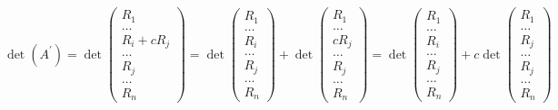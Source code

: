 \documentclass{book}
\begin{document}
\begin{equation}
  \det(A^\prime)=\det\begin{pmatrix}
                     R_1\\
                     \dots\\
                     R_i +cR_j\\
                     \dots\\
                     R_j\\
                     \dots\\
                     R_n
                   \end{pmatrix}=\det
                   \begin{pmatrix}
                     R_1\\
                     \dots\\
                     R_i\\
                     \dots\\
                     R_j\\
                     \dots\\
                     R_n
                   \end{pmatrix}+\det
                   \begin{pmatrix}
                     R_1\\
                     \dots\\
                     cR_j\\
                     \dots\\
                     R_j\\
                     \dots\\
                     R_n
                   \end{pmatrix}=\det
                   \begin{pmatrix}
                     R_1\\
                     \dots\\
                     R_i\\
                     \dots\\
                     R_j\\
                     \dots\\
                     R_n
                   \end{pmatrix}+c\det
                   \begin{pmatrix}
                     R_1\\
                     \dots\\
                     R_j\\
                     \dots\\
                     R_j\\
                     \dots\\
                     R_n
                   \end{pmatrix}
\end{equation}
\end{document}
